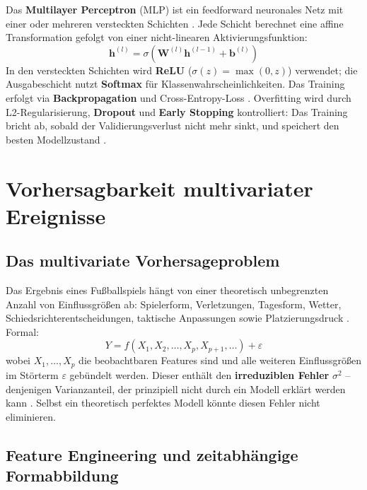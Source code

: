 Das \textbf{Multilayer Perceptron} (MLP) ist ein feedforward neuronales
Netz mit einer oder mehreren versteckten Schichten \cite{GoodfellowEtAl2016}.
Jede Schicht berechnet eine affine Transformation gefolgt von einer
nicht-linearen Aktivierungsfunktion:
\begin{equation}
    \mathbf{h}^{(l)} = \sigma\!\left(\mathbf{W}^{(l)} \mathbf{h}^{(l-1)} + \mathbf{b}^{(l)}\right)
\end{equation}
In den versteckten Schichten wird \textbf{ReLU} ($\sigma(z) = \max(0, z)$)
verwendet; die Ausgabeschicht nutzt \textbf{Softmax} für Klassenwahrscheinlichkeiten.
Das Training erfolgt via \textbf{Backpropagation} und Cross-Entropy-Loss
\cite{RumelhartEtAl1986}. Overfitting wird durch L2-Regularisierung,
\textbf{Dropout} \cite{SrivastavaEtAl2014} und \textbf{Early Stopping}
kontrolliert: Das Training bricht ab, sobald der Validierungsverlust
nicht mehr sinkt, und speichert den besten Modellzustand
\cite{GoodfellowEtAl2016}.

\section{Vorhersagbarkeit multivariater Ereignisse}
\label{sec:vorhersagbarkeit}

\subsection{Das multivariate Vorhersageproblem}

Das Ergebnis eines Fußballspiels hängt von einer theoretisch unbegrenzten
Anzahl von Einflussgrößen ab: Spielerform, Verletzungen, Tagesform,
Wetter, Schiedsrichterentscheidungen, taktische Anpassungen sowie
Platzierungsdruck \cite{DobsonGoddard2011,Sumpter2016}. Formal:
\begin{equation}
    Y = f(X_1, X_2, \dots, X_p, X_{p+1}, \dots) + \varepsilon
\end{equation}
wobei $X_1, \dots, X_p$ die beobachtbaren Features sind und alle weiteren
Einflussgrößen im Störterm $\varepsilon$ gebündelt werden. Dieser enthält
den \textbf{irreduziblen Fehler} $\sigma^2$ -- denjenigen Varianzanteil,
der prinzipiell nicht durch ein Modell erklärt werden kann
\cite{GemanEtAl1992}. Selbst ein theoretisch perfektes Modell könnte
diesen Fehler nicht eliminieren.

\subsection{Feature Engineering und zeitabhängige Formabbildung}

